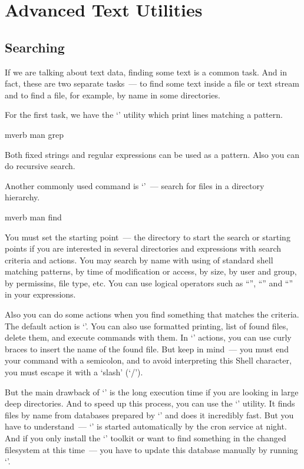 \section*{Advanced Text Utilities}

\subsection*{Searching} %

If we are talking about text data, finding some text is a common task.
And in fact, these are two separate tasks~--- to find some text inside a file
or text stream and to find a file, for example, by name in some directories.

For the first task, we have the `' utility which print lines matching
a pattern.
\begin{code}{mverb}
man grep
\end{code}
Both fixed strings and regular expressions can be used as a pattern.
Also you can do recursive search.

Another commonly used command is `'~--- search for files
in a directory hierarchy.
\begin{code}{mverb}
man find
\end{code}

You must set the starting point~--- the directory to start the search or
starting points if you are interested in several directories and expressions
with search criteria and actions. You may search by name with using of standard
shell matching patterns, by time of modification or access, by size, by user
and group, by permissins, file type, etc. You can use logical operators such
as ``'', ``'' and ``'' in your expressions.

Also you can do some actions when you find something that matches the criteria.
The default action is `'. You can also use formatted printing,
list of found files, delete them, and execute commands with them.
In `' actions, you can use curly braces to insert the name of
the found file. But keep in mind~--- you must end your command with a semicolon,
and to avoid interpreting this Shell character, you must escape it
with a `slash' (`/').

But the main drawback of `' is the long execution time if you are
looking in large deep directories. And to speed up this process, you can use
the `' utility. It finds files by name from databases prepared
by `' and does it incredibly fast. But you have to understand~---
`' is started automatically by the cron service at night.
And if you only install the `' toolkit or want to find something
in the changed filesystem at this time~--- you have to update this database
manually by running `'.

